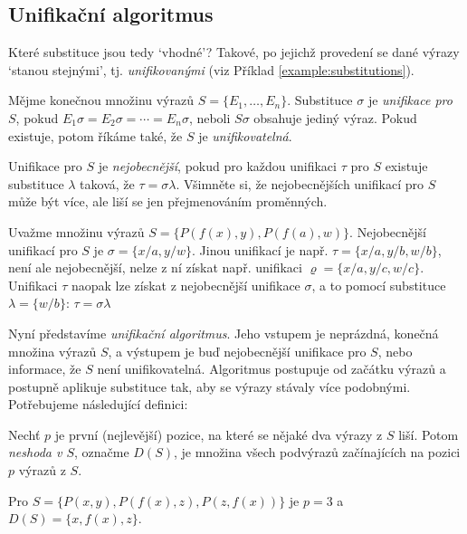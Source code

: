 \subsection{Unifikační algoritmus}

Které substituce jsou tedy `vhodné'? Takové, po jejichž provedení se dané výrazy `stanou stejnými', tj. \emph{unifikovanými} (viz Příklad \ref{example:substitutions}).

\begin{definition}[Unifikace]
    Mějme konečnou množinu výrazů $S=\{E_1,\dots,E_n\}$. Substituce $\sigma$ je \emph{unifikace pro $S$}, pokud $E_1\sigma=E_2\sigma=\cdots =E_n\sigma$, neboli $S\sigma$ obsahuje jediný výraz. Pokud existuje, potom říkáme také, že $S$ je \emph{unifikovatelná}. 
    
    Unifikace pro $S$ je \emph{nejobecnější}, pokud pro každou unifikaci $\tau$ pro $S$ existuje substituce $\lambda$ taková, že $\tau=\sigma\lambda$. Všimněte si, že nejobecnějších unifikací pro $S$ může být více, ale liší se jen přejmenováním proměnných.
\end{definition}

\begin{example}
   Uvažme množinu výrazů $S=\{P(f(x),y),P(f(a),w)\}$. Nejobecnější unifikací pro $S$ je $\sigma=\{x/a,y/w\}$. Jinou unifikací je např. $\tau=\{x/a,y/b,w/b\}$, není ale nejobecnější, nelze z ní získat např. unifikaci $\varrho=\{x/a, y/c, w/c\}$. Unifikaci $\tau$ naopak lze získat z nejobecnější unifikace $\sigma$, a to pomocí substituce $\lambda=\{w/b\}$: $\tau=\sigma\lambda$
\end{example}

Nyní představíme \emph{unifikační algoritmus}. Jeho vstupem je neprázdná, konečná množina výrazů $S$, a výstupem je buď nejobecnější unifikace pro $S$, nebo informace, že $S$ není unifikovatelná. Algoritmus postupuje od začátku výrazů a postupně aplikuje substituce tak, aby se výrazy stávaly více podobnými. Potřebujeme následující definici:

Nechť $p$ je první (nejlevější) pozice, na které se nějaké dva výrazy z $S$ liší. Potom \emph{neshoda v $S$}, označme $D(S)$, je množina všech podvýrazů začínajících na pozici $p$ výrazů z $S$.

\begin{example}
Pro $S=\{P(x,y),P(f(x),z),P(z,f(x))\}$ je $p=3$ a $D(S)=\{x,f(x),z\}$.  
\end{example}

